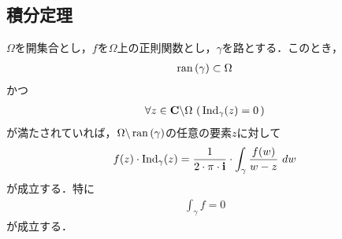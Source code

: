 \subsection{積分定理}
	\begin{screen}
		\begin{thm}[Cauchyの積分定理]
			$\Omega$を開集合とし，$f$を$\Omega$上の正則関数とし，$\gamma$を路とする．このとき，
			\begin{align}
				\operatorname*{ran} \left(\gamma\right) \subset \Omega
			\end{align}
			かつ
			\begin{align}
				\forall z \in \mathbf{C} \backslash \Omega\, \left(\, \operatorname{Ind}_{\gamma}(z) = 0\, \right)
			\end{align}
			が満たされていれば，$\Omega \backslash \operatorname*{ran} \left(\gamma\right)$の任意の要素$z$に対して
			\begin{align}
				f(z) \cdot \operatorname{Ind}_{\gamma}(z) = \frac{1}{2\cdot\pi\cdot\mathbf{i}} \cdot \int_{\gamma} \frac{f(w)}{w - z}\ dw
			\end{align}
			が成立する．特に
			\begin{align}
				\int_\gamma f = 0
			\end{align}
			が成立する．
		\end{thm}
	\end{screen}
	
